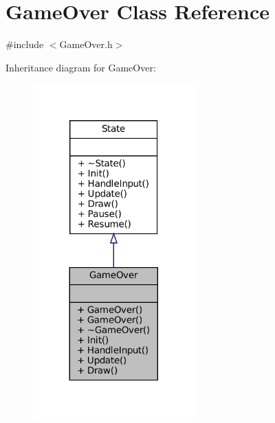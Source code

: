 \hypertarget{classGameOver}{}\section{Game\+Over Class Reference}
\label{classGameOver}


{\ttfamily \#include $<$Game\+Over.\+h$>$}



Inheritance diagram for Game\+Over\+:\nopagebreak
\begin{figure}[H]
\begin{center}
\leavevmode
\includegraphics[width=176pt]{classGameOver__inherit__graph}
\end{center}
\end{figure}


